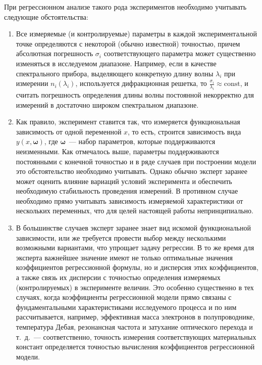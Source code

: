\documentclass[11pt,a4paper]{article}
\theoremstyle{definition}
\begin{document}
При регрессионном анализе такого рода экспериментов необходимо
учитывать следующие обстоятельства:
\begin{enumerate}
  \item Все измеряемые (и контролируемые) параметры в каждой
	экспериментальной точке определяются с некоторой (обычно известной) 
	точностью, причем абсолютная погрешность $\sigma_i$ соответствующего параметра может
	существенно изменяться в исследуемом диапазоне. Например, если в качестве
	спектрального прибора, выделяющего конкретную длину волны $\lambda_i$ при
	измерении $n_i(\lambda_i)$, используется дифракционная решетка, то
	$\frac{\sigma_i}{\lambda_i} \approx \text{const}$, и
	считать погрешность определения длины волны постоянной некорректно для
	измерений в достаточно широком спектральном диапазоне.
  \item Как правило, эксперимент ставится так, что измеряется функциональная
	зависимость от одной переменной $x$, то есть, строится зависимость вида $y(x,
	\boldsymbol{\omega})$, где $\boldsymbol{\omega}$~--- набор параметров,
	которые поддерживаются неизменными. Как
	отмечалось выше, параметры поддерживаются постоянными с конечной
	точностью и в ряде случаев при построении модели это обстоятельство 
	необходимо учитывать. Однако обычно эксперт заранее может оценить
	влияние вариаций условий эксперимента и обеспечить необходимую
	стабильность проведения измерений. В противном случае необходимо прямо
	учитывать зависимость измеряемой характеристики от нескольких
	переменных, что для целей настоящей работы непринципиально.
  \item В большинстве случаев эксперт заранее знает вид
	искомой функциональной зависимости, или же требуется провести выбор
	между несколькими возможными вариантами, что упрощает задачу регрессии.
	В то же время для эксперта важнейшее значение имеют не только
	оптимальные значения коэффициентов регрессионной формулы, но и дисперсия
	этих коэффициентов, а также связь их дисперсии с точностью определения измеряемых
	(контролируемых) в эксперименте величин. Это особенно существенно в тех
	случаях, когда коэффициенты регрессионной модели прямо связаны с
	фундаментальными характеристиками исследуемого процесса и по ним
	рассчитывается, например, эффективная масса электронов в полупроводнике,
	температура Дебая, резонансная частота и затухание оптического перехода и
	т.~д.~--- соответственно, точность измерения соответствующих материальных
	констант определяется точностью вычисления коэффициентов регрессионной
	модели.
\end{enumerate}
\end{document}
